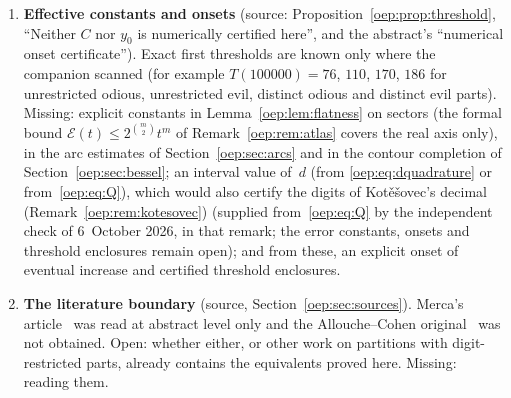 \documentclass[11pt,letterpaper]{article}
\theoremstyle{remark}\newtheorem{remark}[theorem]{Remark}
\newcommand{\calM}{\mathcal M}
\begin{document}
\begin{enumerate}
 and~\eqref{oep:eq:ratiotheorem} are smaller than every power of~$n$.
 \emph{Observations at intake} (exact counts, mpmath models; uncertified):
 $p_\sigma(n)/\calM(n)-1=3.33\cdot10^{-8}$, $8.49\cdot10^{-10}$ (odious) and
 $-4.40\cdot10^{-8}$, $-7.77\cdot10^{-10}$ (evil) at $n=1000$, $3000$, of
 opposite signs for the two signs~$\sigma$; $p_{-,m}(n)/p_{+,m}(n)-(m+1)$ at
 $n=500$, $1000$, $1500$ is $-5.6\cdot10^{-5}$, $-1.6\cdot10^{-6}$,
 $-2.8\cdot10^{-7}$ for $m=1$ and $+5.6\cdot10^{-5}$, $+9.8\cdot10^{-7}$,
 $-2.4\cdot10^{-6}$ for $m=2$, so for $m=2$ it is not of one sign in this
 window. These values determine no rate. Open: the leading term of each
 residual. A natural first step (a sketch by the write): at $q=-1$ the
 signed sum is again flat, since $S(w+\pi i)=(1+e^{-w})S(2w)$ (the factor
 $j=0$ of~\eqref{oep:eq:S} becomes $1+e^{-w}$ and the others are unchanged),
 so a Mellin treatment of the arc near $q=-1$, as in
 Section~\ref{oep:sec:mellin}, looks feasible. Missing: local models at
 $q=-1$ and at the other roots of unity that compete, and a second saddle
 analysis.
\item\label{oep:q:effective} \textbf{Effective constants and onsets}
 (source: Proposition~\ref{oep:prop:threshold}, ``Neither $C$ nor $y_0$ is
 numerically certified here'', and the abstract's ``numerical onset
 certificate''). Exact first thresholds are known only where the companion
 scanned (for example $T(100000)=76$, $110$, $170$, $186$ for unrestricted
 odious, unrestricted evil, distinct odious and distinct evil parts). Missing:
 explicit constants in Lemma~\ref{oep:lem:flatness} on sectors (the formal
 bound $\mathcal E(t)\le2^{\binom m2}t^m$ of Remark~\ref{oep:rem:atlas}
 covers the real axis only), in the arc estimates of
 Section~\ref{oep:sec:arcs} and in the contour completion of
 Section~\ref{oep:sec:bessel}; an interval value of~$d$ (from
 \eqref{oep:eq:dquadrature} or from~\eqref{oep:eq:Q}), which would also
 certify the digits of Kot\v e\v sovec's decimal
 (Remark~\ref{oep:rem:kotesovec}) \textup{(supplied from~\eqref{oep:eq:Q} by
 the independent check of 6~October 2026, in that remark; the error
 constants, onsets and threshold enclosures remain open)}; and from these, an explicit onset of
 eventual increase and certified threshold enclosures.
\item\label{oep:q:literature} \textbf{The literature boundary} (source,
 Section~\ref{oep:sec:sources}). Merca's article~\cite{merca} was read at
 abstract level only and the Allouche--Cohen original~\cite{allouchecohen}
 was not obtained. Open: whether either, or other work on partitions with
 digit-restricted parts, already contains the equivalents proved here.
 Missing: reading them.
\end{enumerate}
\end{document}
